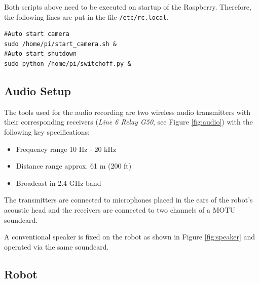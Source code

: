 Both scripts above need to be executed on startup of the Raspberry. Therefore, the following lines are put in the file \texttt{/etc/rc.local}.
\begin{center}
\begin{minipage}{0.9\linewidth}
    \begin{lstlisting}[caption=\texttt{/etc/rc.local}, label=local, frame=none]
#Auto start camera
sudo /home/pi/start_camera.sh &
#Auto start shutdown
sudo python /home/pi/switchoff.py &
\end{lstlisting}
\end{minipage}
\end{center}

 \subsection{Audio Setup}
The tools used for the audio recording are two wireless audio transmitters with their corresponding receivers (\textit{Line 6 Relay G50}, see Figure \ref{fig:audio}) with the following key specifications:

  \begin{itemize}
      \item Frequency range 10 Hz - 20 kHz
      \item Distance range approx. 61 m (200 ft)
      \item Broadcast in 2.4 GHz band
  \end{itemize}

The transmitters are connected to microphones placed in the ears of the robot's acoustic head and the receivers are connected to two channels of a MOTU soundcard.
 
A conventional speaker is fixed on the robot as shown in Figure \ref{fig:speaker} and operated via the same soundcard. 
\subsection{Robot}

